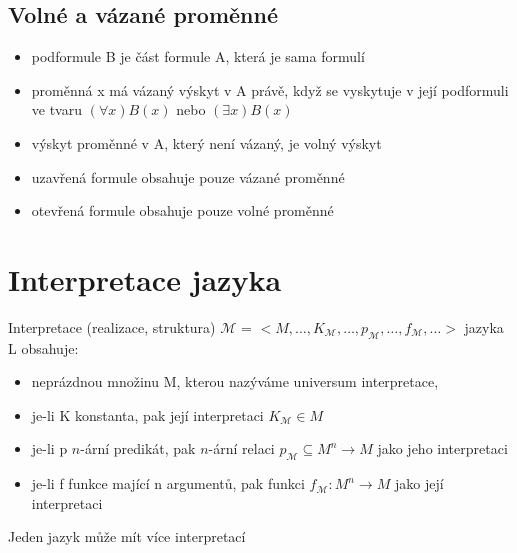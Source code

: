 \documentclass{szzclass}
\begin{document}
\subsection{Volné a vázané proměnné}
\begin{itemize}
  \item podformule B je část formule A, která je sama formulí
  \item proměnná x má vázaný výskyt v A právě, když se vyskytuje v její podformuli ve tvaru $(\forall{x})B(x)$ nebo $(\exists{x})B(x)$
  \item výskyt proměnné v A, který není vázaný, je volný výskyt
\end{itemize}
\begin{itemize}
  \item uzavřená formule obsahuje pouze vázané proměnné
  \item otevřená formule obsahuje pouze volné proměnné
\end{itemize}
\section{Interpretace jazyka}
Interpretace (realizace, struktura) $\mathcal{M}$ = $<M,\dots,K_\mathcal{M},\dots,p_\mathcal{M},\dots,f_\mathcal{M},\dots>$ jazyka L obsahuje:
\begin{itemize}
  \item neprázdnou množinu M, kterou nazýváme universum interpretace,
  \item je-li K konstanta, pak její interpretaci $K_\mathcal{M} \in M$
  \item je-li p $n$-ární predikát, pak $n$-ární relaci $p_\mathcal{M} \subseteq M^n \rightarrow M$ jako jeho interpretaci
  \item je-li f funkce mající n argumentů, pak funkci $f_\mathcal{M}: M^n \rightarrow M$ jako její interpretaci
\end{itemize}
Jeden jazyk může mít více interpretací
\end{document}
